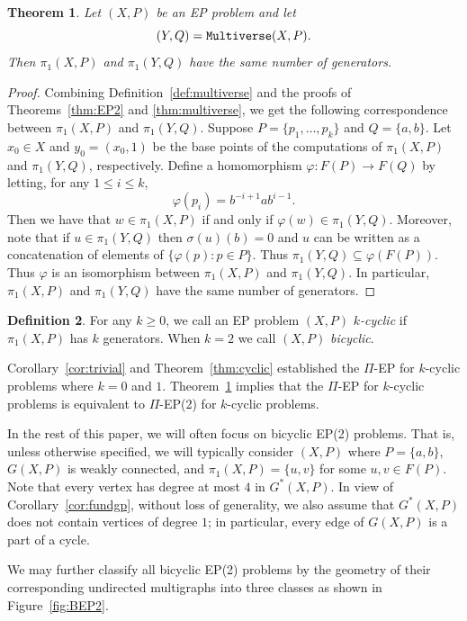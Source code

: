 \documentclass[11pt]{amsart}
\newtheorem{theorem}{Theorem}[section]
\theoremstyle{definition}
\newtheorem{definition}[theorem]{Definition}
\theoremstyle{definition}
\numberwithin{equation}{section}
\begin{document}
\begin{theorem}\label{thm:kcyclic} Let $(X, P)$ be an EP problem and let
$$ (Y, Q)=\mbox{\tt Multiverse}(X, P). $$
Then $\pi_1(X, P)$ and $\pi_1(Y, Q)$ have the same number of generators.
\end{theorem}

\begin{proof} Combining Definition~\ref{def:multiverse} and the proofs of Theorems~\ref{thm:EP2} and \ref{thm:multiverse}, we get the following correspondence between $\pi_1(X, P)$ and $\pi_1(Y, Q)$. Suppose $P=\{p_1,\dots, p_k\}$ and $Q=\{a, b\}$. Let $x_0\in X$ and $y_0=(x_0,1)$ be the base points of the computations of $\pi_1(X, P)$ and $\pi_1(Y, Q)$, respectively. Define a homomorphism $\varphi\colon F(P)\to F(Q)$ by letting, for any $1\leq i\leq k$,
$$ \varphi(p_i)=b^{-i+1}ab^{i-1}. $$
Then we have that $w\in \pi_1(X, P)$ if and only if $\varphi(w)\in \pi_1(Y, Q)$. Moreover, note that if $u\in \pi_1(Y, Q)$ then $\sigma(u)(b)=0$ and $u$ can be written as a concatenation of elements of $\{\varphi(p)\colon p\in P\}$. Thus $\pi_1(Y, Q)\subseteq \varphi(F(P))$. Thus $\varphi$ is an isomorphism between $\pi_1(X, P)$ and $\pi_1(Y, Q)$. In particular, $\pi_1(X, P)$ and $\pi_1(Y, Q)$ have the same number of generators.
\end{proof}

\begin{definition} For any $k\geq 0$, we call an EP problem $(X, P)$ {\em $k$-cyclic} if $\pi_1(X, P)$ has $k$ generators. When $k=2$ we call $(X, P)$ {\em bicyclic}.
\end{definition}

Corollary~\ref{cor:trivial} and Theorem~\ref{thm:cyclic} established the $\Pi$-EP for $k$-cyclic problems where $k=0$ and $1$. Theorem~\ref{thm:kcyclic} implies that the $\Pi$-EP for $k$-cyclic problems is equivalent to $\Pi$-EP(2) for $k$-cyclic problems. 

In the rest of this paper, we will often focus on bicyclic EP(2) problems. That is, unless otherwise specified, we will typically consider $(X, P)$ where $P=\{a, b\}$, $G(X, P)$ is weakly connected, and $\pi_1(X, P)=\{u, v\}$ for some $u, v\in F(P)$. Note that every vertex has degree at most $4$ in $G^*(X, P)$. In view of Corollary~\ref{cor:fundgp}, without loss of generality, we also assume that $G^*(X, P)$ does not contain vertices of degree $1$; in particular, every edge of $G(X, P)$ is a part of a cycle. 

We may further classify all bicyclic EP(2) problems by the geometry of their corresponding undirected multigraphs into three classes as shown in Figure~\ref{fig:BEP2}.
\end{document}
